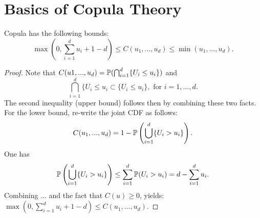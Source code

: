 \section{Basics of Copula Theory}

\begin{lem}
	
	Copula has the following bounds:
	\begin{equation} \label{eq:frechet_bound}
		\max \left(0, \sum_{i=1}^{d} u_i + 1 -d \right) \le C(u_1,...,u_d) \le \min(u_1,...,u_d).
	\end{equation}
\begin{proof}
	Note that $C(u1,...,u_d) = \mathbb{P}( \bigcap_{i=1}^{d} \{U_i \le u_i\})$ and 
	\[\bigcap_{i=1}^{d} \{U_i \le u_i \subset \{U_i \le u_i \}, \text{ for } i=1,...,d.\]
	The second inequality (upper bound) follows then by combining these two facts.
	For the lower bound, re-write the joint CDF as follows:
	\[ C(u_1,..., u_d) = 1- \mathbb{P}\left( \bigcup_{i=1}^{d} \{U_i > u_i\}\right).\]
	One has
	\[\mathbb{P}\left( \bigcup_{i=1}^{d} \{U_i > u_i\}\right) \le \sum_{i=1}^{d} \mathbb{P}( U_i > u_i) = d - \sum_{i=1}^{d} u_i.\]
	Combining ... and the fact that $C(u)\ge 0$, yields:
		$\max(0, \sum_{i=1}^{d} u_i + 1 -d) \le C(u_1,...,u_d)$.
\end{proof}
\end{lem}

